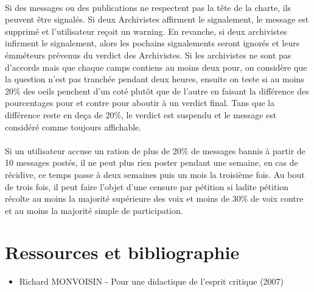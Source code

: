 \documentclass[a4paper,12pt]{article}
\begin{document}
\paragraph{}
Si des messages ou des publications ne respectent pas la tête de la charte, ils peuvent être signalés. Si deux Archivistes affirment le signalement, le message est supprimé et l'utilisateur reçoit un warning. En revanche, si deux archivistes infirment le signalement, alors les pochains signalements seront ignorés et leurs émméteurs prévenus du verdict des Archivistes. Si les archivistes ne sont pas d'accords mais que chaque camps contiens au moins deux pour, on considère que la question n'est pas tranchée pendant deux heures, ensuite on teste si au moins 20\% des oeils penchent d'un coté plutôt que de l'autre en faisant la différence des pourcentages pour et contre pour aboutir à un verdict final. Tans que la différence reste en deça de 20\%, le verdict est suspendu et le message est considéré comme toujours affichable.
\paragraph{}
Si un utilisateur accuse un ration de plus de 20\% de messages bannis à partir de 10 messages postés, il ne peut plus rien poster pendant une semaine, en cas de récidive, ce temps passe à deux semaines puis un mois la troisième fois. Au bout de trois fois, il peut faire l'objet d'une censure par pétition si ladite pétition récolte au moins la majorité supérieure des voix et moins de 30\% de voix contre et au moins la majorité simple de participation.


\section{Ressources et bibliographie}
\begin{itemize}
 \item Richard MONVOISIN - Pour une didactique de l’esprit critique (2007)
\end{itemize}
\end{document}
